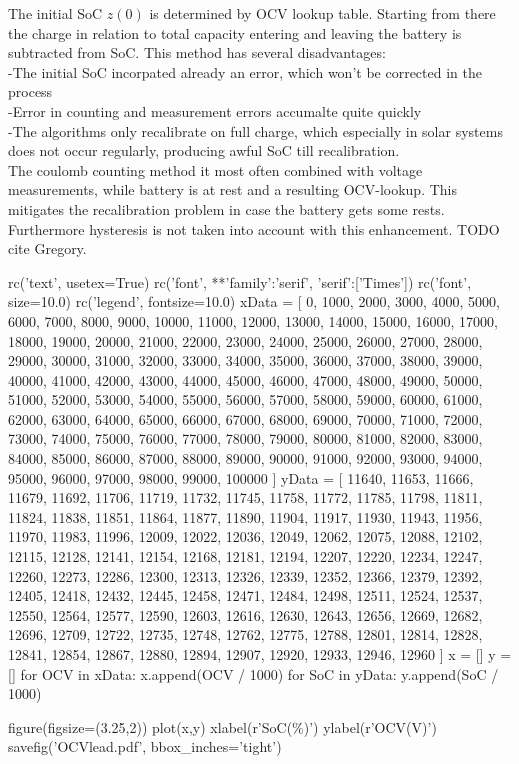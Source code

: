 The initial SoC $z(0)$ is determined by OCV lookup table. Starting from there the charge in relation to total capacity entering and leaving the battery is subtracted from SoC. This method has several disadvantages: \\

-The initial SoC incorpated already an error, which won't be corrected in the process \\
-Error in counting and measurement errors accumalte quite quickly\\
-The algorithms only recalibrate on full charge, which especially in solar systems does not occur regularly, producing awful SoC till recalibration. \\

The coulomb counting method it most often combined with voltage measurements, while battery is at rest and a resulting OCV-lookup. This mitigates the recalibration problem in case the battery gets some rests. Furthermore hysteresis is not taken into account with this enhancement. TODO cite Gregory. %


\begin{pylabcode}[plotsession]
rc('text', usetex=True)
rc('font', **{'family':'serif', 'serif':['Times']})
rc('font', size=10.0)			
rc('legend', fontsize=10.0)
xData = [ 0, 1000, 2000, 3000, 4000, 5000, 6000, 7000, 8000, 9000, 10000, 11000, 12000, 13000, 14000, 15000, 16000, 17000, 18000, 19000, 20000, 21000, 22000, 23000, 24000, 25000, 26000, 27000, 28000, 29000, 30000, 31000, 32000, 33000, 34000, 35000, 36000, 37000, 38000, 39000, 40000, 41000, 42000, 43000, 44000, 45000, 46000, 47000, 48000, 49000, 50000, 51000, 52000, 53000, 54000, 55000, 56000, 57000, 58000, 59000, 60000, 61000, 62000, 63000, 64000, 65000, 66000, 67000, 68000, 69000, 70000, 71000, 72000, 73000, 74000, 75000, 76000, 77000, 78000, 79000, 80000, 81000, 82000, 83000, 84000, 85000, 86000, 87000, 88000, 89000, 90000, 91000, 92000, 93000, 94000, 95000, 96000, 97000, 98000, 99000, 100000 ]
yData = [ 11640, 11653, 11666, 11679, 11692, 11706, 11719, 11732, 11745, 11758, 11772, 11785, 11798, 11811, 11824, 11838, 11851, 11864, 11877, 11890, 11904, 11917, 11930, 11943, 11956, 11970, 11983, 11996, 12009, 12022, 12036, 12049, 12062, 12075, 12088, 12102, 12115, 12128, 12141, 12154, 12168, 12181, 12194, 12207, 12220, 12234, 12247, 12260, 12273, 12286, 12300, 12313, 12326, 12339, 12352, 12366, 12379, 12392, 12405, 12418, 12432, 12445, 12458, 12471, 12484, 12498, 12511, 12524, 12537, 12550, 12564, 12577, 12590, 12603, 12616, 12630, 12643, 12656, 12669, 12682, 12696, 12709, 12722, 12735, 12748, 12762, 12775, 12788, 12801, 12814, 12828, 12841, 12854, 12867, 12880, 12894, 12907, 12920, 12933, 12946, 12960 ]
x = []
y = []
for OCV in xData:
    x.append(OCV / 1000)
for SoC in yData:
    y.append(SoC / 1000)
 
figure(figsize=(3.25,2))
plot(x,y)
xlabel(r'SoC(\%)')
ylabel(r'OCV(V)')
savefig('OCVlead.pdf', bbox_inches='tight')
\end{pylabcode}

